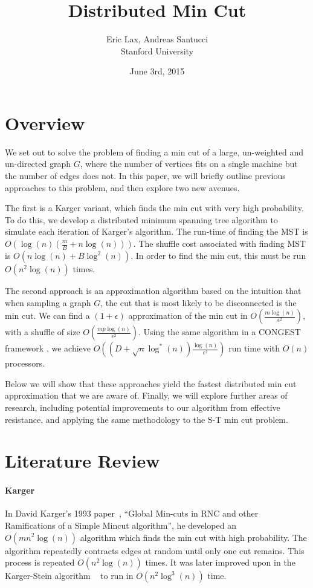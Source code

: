 \documentclass{article}
\begin{document}
 

\title{\textbf{Distributed Min Cut}}
\author{Eric Lax, Andreas Santucci \\ Stanford University}
\date{June 3rd, 2015}
\maketitle

\section{Overview}

We set out to solve the problem of finding a min cut of a large, un-weighted and un-directed graph $G$, where the number of vertices fits on a single machine but the number of edges does not. In this paper, we will briefly outline previous approaches to this problem, and then explore two new avenues.

The first is a Karger variant, which finds the min cut with very high probability. To do this, we develop a distributed minimum spanning tree algorithm to simulate each iteration of Karger's algorithm. The run-time of finding the MST is $O(\log(n) (\frac{m}{B} + n\log(n)))$. The shuffle cost associated with finding MST is $O(n \log(n) + B\log^2(n))$. In order to find the min cut, this must be run $O(n^2 \log(n))$ times. 

The second approach is an approximation algorithm based on the intuition that when sampling a graph $G$, the cut that is most likely to be disconnected is the min cut. We can find a $(1+\epsilon)$ approximation of the min cut in $O(\frac{m \log(n)}{\epsilon^2})$, with a shuffle of size $O(\frac{mp \log(n)}{\epsilon^2})$. Using the same algorithm in a CONGEST framework \cite{Almost-Tight}, we achieve 
$O((D + \sqrt{n} \log^*(n)) \frac{\log(n)}{\epsilon^2})$ run time with $O(n)$ processors. 

Below we will show that these approaches yield the fastest distributed min cut approximation that we are aware of. Finally, we will explore further areas of research, including potential improvements to our algorithm from effective resistance, and applying the same methodology to the S-T min cut problem.

\section{Literature Review}

\paragraph{Karger} In David Karger's 1993 paper~\cite{Karger}, ``Global Min-cuts in RNC and other Ramifications of a Simple Mincut algorithm'', he developed an $O(m n^2 \log(n))$ algorithm which finds the min cut with high probability. The algorithm repeatedly contracts edges at random until only one cut remains. This process is repeated $O(n^2 \log(n))$ times. It was later improved upon in the Karger-Stein algorithm ~\cite{Karger-Stein} to run in $O(n^2 \log^3(n))$ time.
\end{document}
